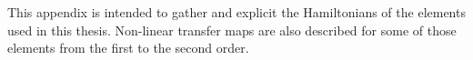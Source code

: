 \appendix  %


%
%
%
%        
%
%
%
%


\chapter{}
\label{appendix:transfer_maps}
\thumbforappendix
\par

This appendix is intended to gather and explicit the Hamiltonians of the elements used in this 
thesis. Non-linear transfer maps are also described for some of those elements from the first to
the second order.

